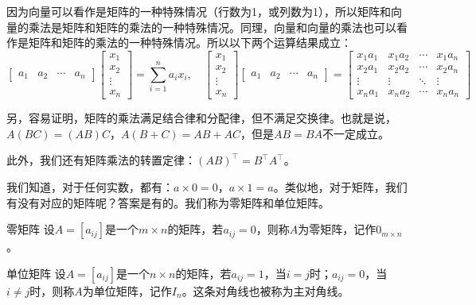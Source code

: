 因为向量可以看作是矩阵的一种特殊情况（行数为1，或列数为1），所以矩阵和向量的乘法是矩阵和矩阵的乘法的一种特殊情况。同理，向量和向量的乘法也可以看作是矩阵和矩阵的乘法的一种特殊情况。所以以下两个运算结果成立：
\begin{equation}
    \begin{bmatrix}
        a_1 & a_2 & \cdots & a_n
    \end{bmatrix}
    \begin{bmatrix}
        x_1 \\ x_2 \\ \vdots \\ x_n
    \end{bmatrix} = \sum_{i=1}^{n} a_i x_i, \quad
    \begin{bmatrix}
        x_1 \\ x_2 \\ \vdots \\ x_n
    \end{bmatrix}
    \begin{bmatrix}
        a_1 & a_2 & \cdots & a_n
    \end{bmatrix} =
    \begin{bmatrix}
        x_1 a_1 & x_1 a_2 & \cdots & x_1 a_n \\
        x_2 a_1 & x_2 a_2 & \cdots & x_2 a_n \\
        \vdots & \vdots & \ddots & \vdots \\
        x_n a_1 & x_n a_2 & \cdots & x_n a_n
    \end{bmatrix}
\end{equation}

另，容易证明，矩阵的乘法满足结合律和分配律，但不满足交换律。也就是说，$A(BC) = (AB)C$，$A(B + C) = AB + AC$，但是$AB = BA$不一定成立。

此外，我们还有矩阵乘法的转置定律：$(AB)^\top = B^\top A^\top$。

我们知道，对于任何实数，都有：$a \times 0 = 0$，$a \times 1 = a$。类似地，对于矩阵，我们有没有对应的矩阵呢？答案是有的。我们称为零矩阵和单位矩阵。
\begin{definition}{零矩阵}{}
    设$A = [a_{ij}]$是一个$m \times n$的矩阵，若$a_{ij} = 0$，则称$A$为零矩阵，记作$0_{m \times n}$。
\end{definition}
\begin{definition}{单位矩阵}{}
    设$A = [a_{ij}]$是一个$n \times n$的矩阵，若$a_{ij} = 1$，当$i = j$时；$a_{ij} = 0$，当$i \neq j$时，则称$A$为单位矩阵，记作$I_n$。这条对角线也被称为主对角线。
\end{definition}

